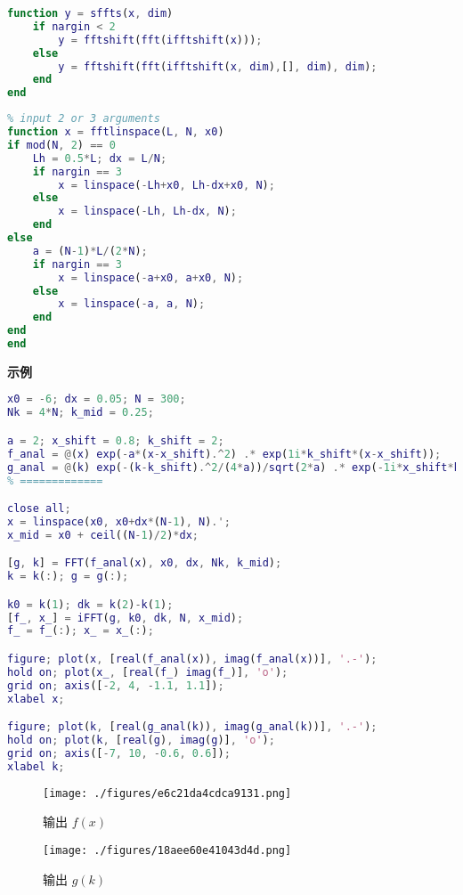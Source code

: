 \begin{lstlisting}[language=matlab, caption=sffts.m]
% shifted fft
function y = sffts(x, dim)
    if nargin < 2
        y = fftshift(fft(ifftshift(x)));
    else
        y = fftshift(fft(ifftshift(x, dim),[], dim), dim);
    end
end
\end{lstlisting}

\begin{lstlisting}[language=matlab, caption=fftlinspace.m]
% generate N grid points from bandwidth
% input 2 or 3 arguments
function x = fftlinspace(L, N, x0)
if mod(N, 2) == 0
    Lh = 0.5*L; dx = L/N;
    if nargin == 3
        x = linspace(-Lh+x0, Lh-dx+x0, N);
    else
        x = linspace(-Lh, Lh-dx, N);
    end
else
    a = (N-1)*L/(2*N);
    if nargin == 3
        x = linspace(-a+x0, a+x0, N);
    else
        x = linspace(-a, a, N);
    end
end
end
\end{lstlisting}

\textbf{示例}
\begin{lstlisting}[language=matlab]
% === params ===
x0 = -6; dx = 0.05; N = 300;
Nk = 4*N; k_mid = 0.25;

a = 2; x_shift = 0.8; k_shift = 2;
f_anal = @(x) exp(-a*(x-x_shift).^2) .* exp(1i*k_shift*(x-x_shift));
g_anal = @(k) exp(-(k-k_shift).^2/(4*a))/sqrt(2*a) .* exp(-1i*x_shift*k);
% ============= 

close all;
x = linspace(x0, x0+dx*(N-1), N).';
x_mid = x0 + ceil((N-1)/2)*dx;

[g, k] = FFT(f_anal(x), x0, dx, Nk, k_mid);
k = k(:); g = g(:);

k0 = k(1); dk = k(2)-k(1);
[f_, x_] = iFFT(g, k0, dk, N, x_mid);
f_ = f_(:); x_ = x_(:);

figure; plot(x, [real(f_anal(x)), imag(f_anal(x))], '.-');
hold on; plot(x_, [real(f_) imag(f_)], 'o');
grid on; axis([-2, 4, -1.1, 1.1]);
xlabel x;

figure; plot(k, [real(g_anal(k)), imag(g_anal(k))], '.-');
hold on; plot(k, [real(g), imag(g)], 'o');
grid on; axis([-7, 10, -0.6, 0.6]);
xlabel k;
\end{lstlisting}

\begin{figure}[ht]
\centering
\texttt{[image: ./figures/e6c21da4cdca9131.png]}
\caption{输出 $f(x)$} \label{fig_FFTft_1}
\end{figure}
\begin{figure}[ht]
\centering
\texttt{[image: ./figures/18aee60e41043d4d.png]}
\caption{输出 $g(k)$} \label{fig_FFTft_2}
\end{figure}


